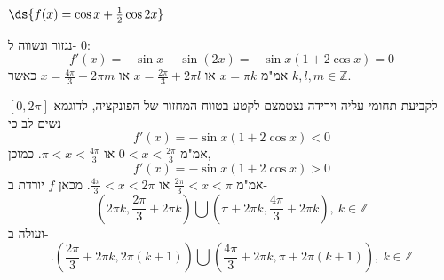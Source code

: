 \item $\ds{f(x) = \cos{x} + \frac{1}{2} \cos{2x}}$
\begin{solbox}
נגזור ונשווה ל-
$0$:
$$f'(x)=-\sin x-\sin(2x)=-\sin x(1+2\cos x)=0$$
אמ"מ
$x=\pi k$
או
$x=\frac{2\pi}{3}+2\pi l$
או
$x=\frac{4\pi}{3}+2\pi m$
כאשר
$k,l,m\in\mathbb{Z}$.

לקביעת תחומי עליה וירידה נצטמצם לקטע בטווח המחזור של הפונקציה, לדוגמא
$[0,2\pi]$
נשים לב כי
$$f'(x)=-\sin x(1+2\cos x)<0$$
אמ"מ
$0<x<\frac{2\pi}{3}$
או
$\pi<x<\frac{4\pi}{3}$.
כמוכן,
$$f'(x)=-\sin x(1+2\cos x)>0$$
אמ"מ
$\frac{2\pi}{3}<x<\pi$
או
$\frac{4\pi}{3}<x<2\pi$.
מכאן
$f$
יורדת ב-
$$\left(2\pi k,\frac{2\pi}{3}+2\pi k\right)\bigcup\left(\pi+2\pi k,\frac{4\pi}{3}+2\pi k\right),\ k\in\mathbb{Z}$$
ועולה ב-
$$.\left(\frac{2\pi}{3}+2\pi k,2\pi (k+1)\right)\bigcup\left(\frac{4\pi}{3}+2\pi k,\pi+2\pi (k+1)\right),\ k\in\mathbb{Z}$$
\end{solbox}
\eMs
\eE

